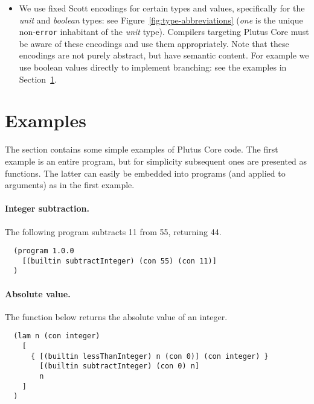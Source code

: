 \documentclass[a4paper]{article}
\begin{document}
\begin{itemize}
%
%

  \item We use fixed Scott encodings for certain types and values,
    specifically for the \textit{unit} and \textit{boolean} types: see
    Figure~\ref{fig:type-abbreviations} (\textit{one} is the unique
    non-\verb|error| inhabitant of the \textit{unit} type).  Compilers
    targeting Plutus Core must be aware of these encodings and use
    them appropriately.  Note that these encodings are not purely
    abstract, but have semantic content. For example we use boolean
    values directly to implement branching: see the examples in
    Section~\ref{sec:examples}.
\end{itemize}


\section{Examples}
\label{sec:examples}
The section contains some simple examples of Plutus Core code. The
first example is an entire program, but for simplicity subsequent ones
are presented as functions. The latter can easily be embedded into
programs (and applied to arguments) as in the first example.

\paragraph{Integer subtraction.}
The following program subtracts 11 from 55, returning 44.

\begin{verbatim}
  (program 1.0.0
    [(builtin subtractInteger) (con 55) (con 11)]
  )
\end{verbatim}


\paragraph{Absolute value.} The function below returns the absolute value of an
integer.
\begin{verbatim}
  (lam n (con integer)
    [
      { [(builtin lessThanInteger) n (con 0)] (con integer) }
        [(builtin subtractInteger) (con 0) n]
        n
    ]
  )
\end{verbatim}
\end{document}
